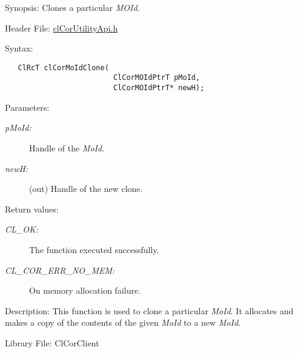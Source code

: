 \begin{Desc}
\item[Synopsis:]Clones a particular {\em MOId\/}.\end{Desc}
\begin{Desc}
\item[Header File:]\hyperlink{cl_cor_utility_api_8h}{cl\-Cor\-Utility\-Api.h}\end{Desc}
\begin{Desc}
\item[Syntax:]

\footnotesize\begin{verbatim}   ClRcT clCorMoIdClone(
                         ClCorMOIdPtrT pMoId,
                         ClCorMOIdPtrT* newH);
\end{verbatim}
\normalsize
\end{Desc}
\begin{Desc}
\item[Parameters:]
\begin{description}
\item[{\em p\-Mo\-Id:}]Handle of the {\em Mo\-Id\/}. \item[{\em new\-H:}](out) Handle of the new clone.\end{description}
\end{Desc}
\begin{Desc}
\item[Return values:]
\begin{description}
\item[{\em CL\_\-OK:}]The function executed successfully. \item[{\em CL\_\-COR\_\-ERR\_\-NO\_\-MEM:}]On memory allocation failure.\end{description}
\end{Desc}
\begin{Desc}
\item[Description:]This function is used to clone a particular {\em Mo\-Id\/}. It allocates and makes a copy of the contents of the given {\em Mo\-Id\/} to a new {\em Mo\-Id\/}.\end{Desc}
\begin{Desc}
\item[Library File:]Cl\-Cor\-Client\end{Desc}
